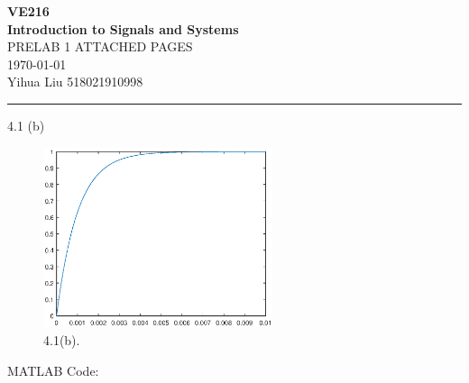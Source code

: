 \documentclass[a4paper]{article}
\begin{document}
\begin{center}
\huge
\textbf{VE216\\Introduction to Signals and Systems\\}
\Large
\vspace{30pt}
\uppercase{Prelab 1 Attached Pages}\\
\vspace{5pt}\today\\
\vspace{5pt}
Yihua Liu 518021910998
\vspace{5pt}
\rule[-10pt]{.97\linewidth}{0.05em}
\end{center}

4.1 (b)
\begin{figure}[H]
    \begin{center}
        \includegraphics[width=0.6\textwidth]{4.1(b).eps}
    \end{center}
    \caption{4.1(b).}
\end{figure}
MATLAB Code:

\end{document}
